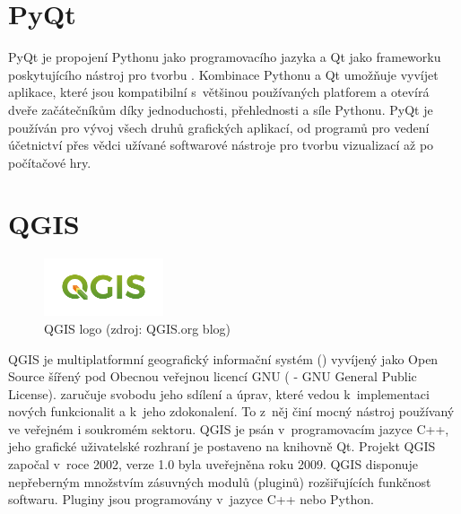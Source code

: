 \section{PyQt} PyQt je propojení Pythonu jako programovacího jazyka a
Qt jako frameworku poskytujícího nástroj pro tvorbu
. Kombinace Pythonu a Qt umožňuje vyvíjet aplikace, které jsou
kompatibilní s~většinou používaných platforem a otevírá dveře
začátečníkům díky jednoduchosti, přehlednosti a síle Pythonu. PyQt je
používán pro vývoj všech druhů grafických aplikací, od programů pro
vedení účetnictví přes vědci užívané softwarové nástroje pro tvorbu
vizualizací až po počítačové hry. \cite{rapidPyQt}

\section{QGIS}

\begin{figure}[H] \centering
      \includegraphics[width=100pt]{./pictures/qgis.png}
      \caption[QGIS logo]{QGIS logo (zdroj: QGIS.org blog)}
      \label{fig:qgis}
\end{figure}
 
QGIS je multiplatformní geografický informační systém ()
vyvíjený jako Open Source šířený pod Obecnou veřejnou licencí GNU
( - GNU General Public License).  zaručuje
svobodu jeho sdílení a úprav, které vedou k~implementaci nových
funkcionalit a k~jeho zdokonalení. To z~něj činí mocný nástroj
používaný ve veřejném i soukromém sektoru. QGIS je psán
v~programovacím jazyce C++, jeho grafické uživatelské rozhraní je
postaveno na knihovně Qt. Projekt QGIS započal v~roce 2002, verze 1.0
byla uveřejněna roku 2009. QGIS disponuje nepřeberným množstvím
zásuvných modulů (pluginů) rozšiřujících funkčnost softwaru. Pluginy
jsou programovány v~jazyce C++ nebo Python. \cite{masteringQgis}
